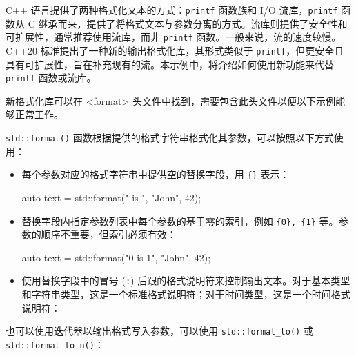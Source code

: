 
C++ 语言提供了两种格式化文本的方式：\verb|printf| 函数族和 I/O 流库，\verb|printf| 函数从 C 继承而来，提供了将格式文本与参数分离的方式。流库则提供了安全性和可扩展性，通常推荐使用流库，而非 \verb|printf| 函数。一般来说，流的速度较慢。C++20 标准提出了一种新的输出格式化库，其形式类似于 \verb|printf|，但更安全且具有可扩展性，旨在补充现有的流。本示例中，将介绍如何使用新功能来代替 \verb|printf| 函数或流库。


新格式化库可以在 <format> 头文件中找到，需要包含此头文件以便以下示例能够正常工作。


\verb|std::format()| 函数根据提供的格式字符串格式化其参数，可以按照以下方式使用：

\begin{itemize}
\item
每个参数对应的格式字符串中提供空的替换字段，用 \verb|{}| 表示：

\begin{cpp}
auto text = std::format("{} is {}", "John", 42);
\end{cpp}

\item
替换字段内指定参数列表中每个参数的基于零的索引，例如 \verb|{0}, {1}| 等。参数的顺序不重要，但索引必须有效：

\begin{cpp}
auto text = std::format("{0} is {1}", "John", 42);
\end{cpp}

\item
使用替换字段中的冒号 (\verb|:|) 后跟的格式说明符来控制输出文本。对于基本类型和字符串类型，这是一个标准格式说明符；对于时间类型，这是一个时间格式说明符：

\end{itemize}

也可以使用迭代器以输出格式写入参数，可以使用 \verb|std::format_to()| 或 \verb|std::format_to_n()|：

